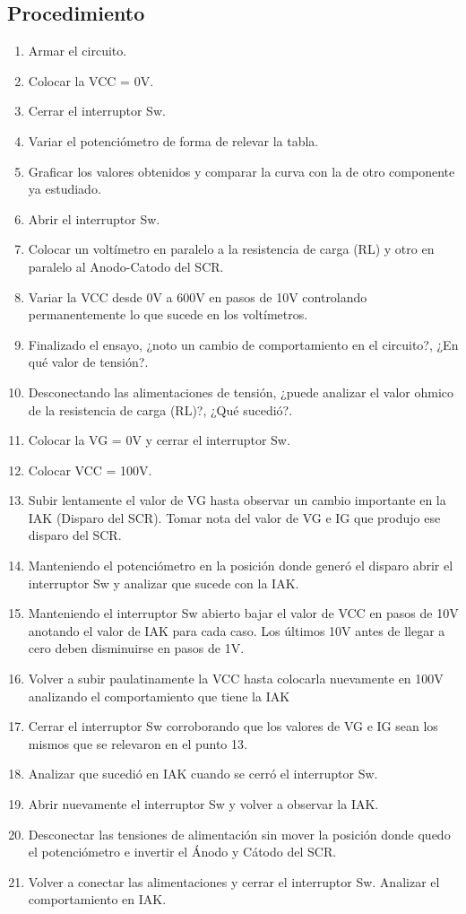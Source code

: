 \subsection{Procedimiento}
\begin{enumerate}
  \item Armar el circuito.
  \item Colocar la VCC = 0V.
  \item Cerrar el interruptor Sw.
  \item Variar el potenciómetro de forma de relevar la tabla.
  \item Graficar los valores obtenidos y comparar la curva con la de otro
    componente ya estudiado.
  \item Abrir el interruptor Sw.
  \item Colocar un voltímetro en paralelo a la resistencia de carga (RL) y otro en paralelo al Anodo-Catodo del SCR.
  \item Variar la VCC desde 0V a 600V en pasos de 10V controlando permanentemente lo que sucede en los voltímetros.
  \item Finalizado el ensayo, ¿noto un cambio de comportamiento en el circuito?, ¿En qué valor de tensión?.
  \item Desconectando las alimentaciones de tensión, ¿puede analizar el valor ohmico de la 
    resistencia de carga (RL)?, ¿Qué sucedió?.
  \item Colocar la VG = 0V y cerrar el interruptor Sw.
  \item Colocar VCC = 100V.
  \item Subir lentamente el valor de VG hasta observar un cambio importante en la IAK (Disparo del SCR). 
    Tomar nota del valor de VG e IG que produjo ese disparo del SCR.
  \item Manteniendo el potenciómetro en la posición donde generó el disparo abrir el 
    interruptor Sw y analizar que sucede con la IAK.
  \item Manteniendo el interruptor Sw abierto bajar el valor de VCC en pasos de 10V 
    anotando el valor de IAK para cada caso. Los últimos 10V antes de llegar a cero deben disminuirse en pasos de 1V.
  \item Volver a subir paulatinamente la VCC hasta colocarla nuevamente en 100V
    analizando el comportamiento que tiene la IAK
  \item Cerrar el interruptor Sw corroborando que los valores de VG e IG sean los
mismos que se relevaron en el punto 13.
  \item Analizar que sucedió en IAK cuando se cerró el interruptor Sw.
  \item Abrir nuevamente el interruptor Sw y volver a observar la IAK.
  \item Desconectar las tensiones de alimentación sin mover la posición donde
quedo el potenciómetro e invertir el Ánodo y Cátodo del SCR.
  \item Volver a conectar las alimentaciones y cerrar el interruptor Sw. Analizar el
comportamiento en IAK.
\end{enumerate}
